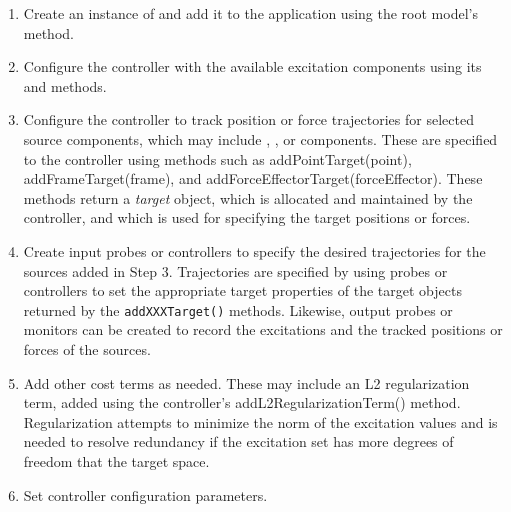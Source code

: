\begin{enumerate}

\item Create an instance of 
 and add it to the application
using the root model's
 method.

\item Configure the controller with the available excitation components 
using its
and
methods.

\item Configure the controller to track position or force
trajectories for selected source components, which may include
,
,
or 
components. These are specified to the controller using methods such as
%
{addPointTarget(point)},
%
{addFrameTarget(frame)},
and 
%
{addForceEffectorTarget(forceEffector)}. These methods return a {\it target}
object, which is allocated and maintained by the controller, and which is used
for specifying the target positions or forces.

\item Create input probes or controllers to specify the desired
trajectories for the sources added in Step 3. Trajectories are specified by
using probes or controllers to set the appropriate target properties of the
target objects returned by the {\tt addXXXTarget()} methods.  Likewise, output
probes or monitors can be created to record the excitations and the tracked
positions or forces of the sources.

\item Add other cost terms as needed. These may include
an L2 regularization term, added using the controller's
%
{addL2RegularizationTerm()} method. Regularization attempts to minimize the norm
of the excitation values and is needed to resolve redundancy if the excitation
set has more degrees of freedom that the target space.

\item Set controller configuration parameters.

\end{enumerate}

